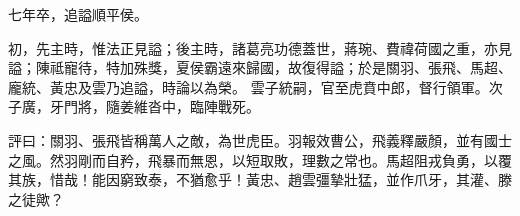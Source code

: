\begin{pinyinscope}
 
 
 
 七年卒，追謚順平侯。
 
 
初，先主時，惟法正見謚；後主時，諸葛亮功德蓋世，蔣琬、費禕荷國之重，亦見謚；陳祗寵待，特加殊獎，夏侯霸遠來歸國，故復得謚；於是關羽、張飛、馬超、龐統、黃忠及雲乃追謚，時論以為榮。
 雲子統嗣，官至虎賁中郎，督行領軍。次子廣，牙門將，隨姜維沓中，臨陣戰死。
 
 
 
 
 評曰：關羽、張飛皆稱萬人之敵，為世虎臣。羽報效曹公，飛義釋嚴顏，並有國士之風。然羽剛而自矜，飛暴而無恩，以短取敗，理數之常也。馬超阻戎負勇，以覆其族，惜哉！能因窮致泰，不猶愈乎！黃忠、趙雲彊摯壯猛，並作爪牙，其灌、滕之徒歟？
 
 
\end{pinyinscope}